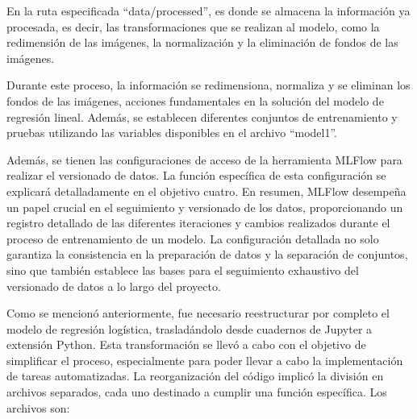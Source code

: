 En la ruta especificada ``data/processed'', es donde se almacena la información ya procesada, es decir, las transformaciones que se realizan al modelo, como la redimensión de las imágenes, la normalización y la eliminación de fondos de las imágenes. \newline

Durante este proceso, la información se redimensiona, normaliza y se eliminan los fondos de las imágenes, acciones fundamentales en la solución del modelo de regresión lineal. Además, se establecen diferentes conjuntos de entrenamiento y pruebas utilizando las variables disponibles en el archivo ``model1''. \newline

Además, se tienen las configuraciones de acceso de la herramienta MLFlow para realizar el versionado de datos. La función específica de esta configuración se explicará detalladamente en el objetivo cuatro. En resumen, MLFlow desempeña un papel crucial en el seguimiento y versionado de los datos, proporcionando un registro detallado de las diferentes iteraciones y cambios realizados durante el proceso de entrenamiento de un modelo. La configuración detallada no solo garantiza la consistencia en la preparación de datos y la separación de conjuntos, sino que también establece las bases para el seguimiento exhaustivo del versionado de datos a lo largo del proyecto. \newline

Como se mencionó anteriormente, fue necesario reestructurar por completo el modelo de regresión logística, trasladándolo desde cuadernos de Jupyter a extensión Python. Esta transformación se llevó a cabo con el objetivo de simplificar el proceso, especialmente para poder llevar a cabo la implementación de tareas automatizadas. La reorganización del código implicó la división en archivos separados, cada uno destinado a cumplir una función específica. Los archivos son: \newline

\newpage

